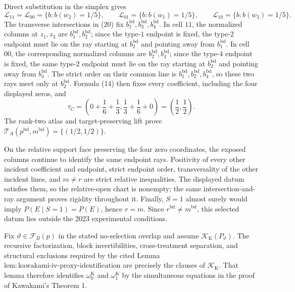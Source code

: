 Direct substitution in the simplex gives
\[
 \mathcal L_{11}=\mathcal L_{00}
 =\{b:b(w_2)=1/5\},\qquad
 \mathcal L_{01}=\{b:b(w_1)=1/5\},\qquad
 \mathcal L_{10}=\{b:b(w_3)=1/5\}.                       \tag{20}
\]
The transverse intersections in (20) fix \(b_1^{\mathrm{bd}},b_3^{\mathrm{bd}},b_4^{\mathrm{bd}}\).  In cell \(11\), the normalized columns at \(z_1,z_3\) are \(b_1^{\mathrm{bd}},b_2^{\mathrm{bd}}\); since the type-\(1\) endpoint is fixed, the type-\(2\) endpoint must lie on the ray starting at \(b_2^{\mathrm{bd}}\) and pointing away from \(b_1^{\mathrm{bd}}\).  In cell \(00\), the corresponding normalized columns are \(b_2^{\mathrm{bd}},b_4^{\mathrm{bd}}\); since the type-\(4\) endpoint is fixed, the same type-\(2\) endpoint must lie on the ray starting at \(b_2^{\mathrm{bd}}\) and pointing away from \(b_4^{\mathrm{bd}}\).  The strict order on their common line is \(b_1^{\mathrm{bd}},b_2^{\mathrm{bd}},b_4^{\mathrm{bd}}\), so these two rays meet only at \(b_2^{\mathrm{bd}}\).  Formula (14) then fixes every coefficient, including the four displayed zeros, and
\[
 \tau_C
 =\left(0+\frac16+\frac13,
          \frac13+\frac16+0\right)
 =\left(\frac12,\frac12\right).                          \tag{21}
\]
The rank-two atlas and target-preserving lift prove
\(\mathcal T_A(p^{\mathrm{bd}},m^{\mathrm{bd}})=\{(1/2,1/2)\}\).

On the relative support face preserving the four zero coordinates, the exposed columns continue to identify the same endpoint rays.  Positivity of every other incident coefficient and endpoint, strict endpoint order, transversality of the other incident lines, and \(m\ne r\) are strict relative inequalities.  The displayed datum satisfies them, so the relative-open chart is nonempty; the same intersection-and-ray argument proves rigidity throughout it.  Finally, \(S=1\) almost surely would imply \(P(E\mid S=1)=P(E)\), hence \(r=m\).  Since \(r^{\mathrm{bd}}\ne m^{\mathrm{bd}}\), this selected datum lies outside the 2023 experimental conditions.

Fix \(\vartheta\in\mathcal F_B(p)\) in the stated no-selection overlap and assume \(\mathcal K_{\mathrm K}(P_{\vartheta})\).  The recursive factorization, block invertibilities, cross-treatment separation, and structural exclusions required by the cited Lemma \(\mathrm{lem{:}kawakami\text{-}iv\text{-}proxy\text{-}identification}\) are precisely the clauses of \(\mathcal K_{\mathrm K}\).  That lemma therefore identifies \(\omega_0^{\mathrm K}\) and \(\omega_1^{\mathrm K}\) by the simultaneous equations in the proof of Kawakami's Theorem 1.

